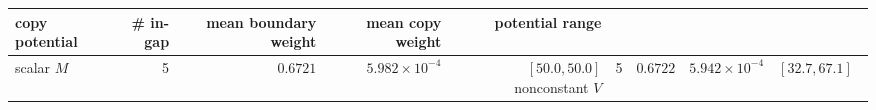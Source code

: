 \begin{tabular}{@{}lrrrr@{}}
\toprule
copy potential & \# in-gap & mean boundary weight & mean copy weight & potential range \\
\midrule
scalar $M$ & 5 & $0.6721$ & $5.982\times 10^{-4}$ & $[50.0,50.0]$ \
nonconstant $V$ & 5 & $0.6722$ & $5.942\times 10^{-4}$ & $[32.7,67.1]$ \
\bottomrule
\end{tabular}
